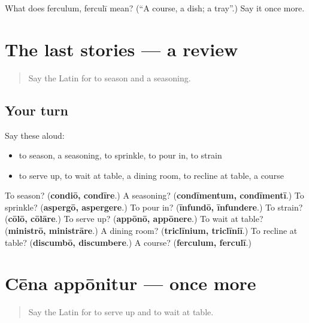 \begin{tcolorbox}[breakable,colback=teal!4,colframe=teal!35!black,title={Before you move on}]
What does ferculum, ferculī mean? (\textquotedblleft{}A course, a dish; a tray\textquotedblright{}.) Say it once more.
\end{tcolorbox}
\section[(dialogue)]{The last stories — a review}

\label{lesson:LA-R356-review-355-356}



\begin{quote}
Say the Latin for to season and a seasoning.
\end{quote}

\subsection*{Your turn}
Say these aloud:

\begin{itemize}
\raggedright
  \item to season, a seasoning, to sprinkle, to pour in, to strain
  \item to serve up, to wait at table, a dining room, to recline at table, a course
\end{itemize}

\begin{tcolorbox}[breakable,colback=teal!4,colframe=teal!35!black,title={Before you move on}]
To season? (\textbf{condiō, condīre}.) A seasoning? (\textbf{condīmentum, condīmentī}.) To sprinkle? (\textbf{aspergō, aspergere}.) To pour in? (\textbf{īnfundō, īnfundere}.) To strain? (\textbf{cōlō, cōlāre}.) To serve up? (\textbf{appōnō, appōnere}.) To wait at table? (\textbf{ministrō, ministrāre}.) A dining room? (\textbf{triclīnium, triclīniī}.) To recline at table? (\textbf{discumbō, discumbere}.) A course? (\textbf{ferculum, ferculī}.)
\end{tcolorbox}
\section[(dialogue)]{Cēna appōnitur — once more}

\label{lesson:LA-R356-review-final-356}



\begin{quote}
Say the Latin for to serve up and to wait at table.
\end{quote}

